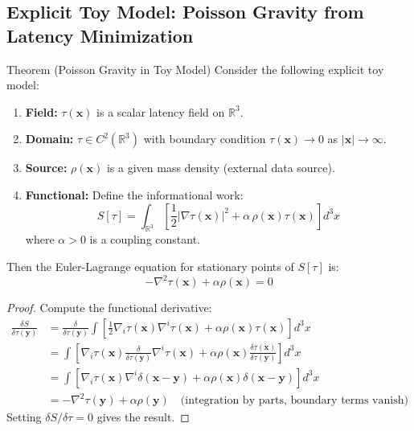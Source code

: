 
\subsection{Explicit Toy Model: Poisson Gravity from Latency Minimization}

\begin{mytheorem}{Theorem (Poisson Gravity in Toy Model)}
\label{thm:poisson-toy}
Consider the following explicit toy model:
\begin{enumerate}
    \item \textbf{Field:} $\tau(\mathbf{x})$ is a scalar latency field on $\mathbb{R}^3$.
    \item \textbf{Domain:} $\tau \in C^2(\mathbb{R}^3)$ with boundary condition $\tau(\mathbf{x}) \to 0$ as $|\mathbf{x}| \to \infty$.
    \item \textbf{Source:} $\rho(\mathbf{x})$ is a given mass density (external data source).
    \item \textbf{Functional:} Define the informational work:
    \[
    S[\tau] = \int_{\mathbb{R}^3} \left[ \frac{1}{2} |\nabla \tau(\mathbf{x})|^2 + \alpha \, \rho(\mathbf{x}) \tau(\mathbf{x}) \right] d^3x
    \]
    where $\alpha > 0$ is a coupling constant.
\end{enumerate}
Then the Euler-Lagrange equation for stationary points of $S[\tau]$ is:
\[
-\nabla^2 \tau(\mathbf{x}) + \alpha \rho(\mathbf{x}) = 0
\]
\end{mytheorem}

\begin{proof}
Compute the functional derivative:
\begin{align*}
\frac{\delta S}{\delta \tau(\mathbf{y})} 
&= \frac{\delta}{\delta \tau(\mathbf{y})} \int \left[ \frac{1}{2} \nabla_i \tau(\mathbf{x}) \nabla^i \tau(\mathbf{x}) + \alpha \rho(\mathbf{x}) \tau(\mathbf{x}) \right] d^3x \\
&= \int \left[ \nabla_i \tau(\mathbf{x}) \frac{\delta}{\delta \tau(\mathbf{y})} \nabla^i \tau(\mathbf{x}) + \alpha \rho(\mathbf{x}) \frac{\delta \tau(\mathbf{x})}{\delta \tau(\mathbf{y})} \right] d^3x \\
&= \int \left[ \nabla_i \tau(\mathbf{x}) \nabla^i \delta(\mathbf{x} - \mathbf{y}) + \alpha \rho(\mathbf{x}) \delta(\mathbf{x} - \mathbf{y}) \right] d^3x \\
&= -\nabla^2 \tau(\mathbf{y}) + \alpha \rho(\mathbf{y}) \quad \text{(integration by parts, boundary terms vanish)}
\end{align*}
Setting $\delta S/\delta \tau = 0$ gives the result.
\end{proof}

